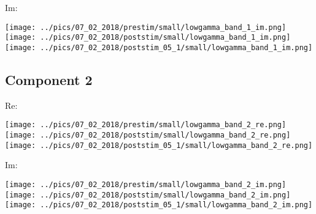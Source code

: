 \documentclass{article}
\begin{document}
Im:

\hspace{0.5cm}
\texttt{[image: ../pics/07\_02\_2018/prestim/small/lowgamma\_band\_1\_im.png]}
\hspace{0.5cm}
\texttt{[image: ../pics/07\_02\_2018/poststim/small/lowgamma\_band\_1\_im.png]}
\hspace{0.5cm}
\texttt{[image: ../pics/07\_02\_2018/poststim\_05\_1/small/lowgamma\_band\_1\_im.png]}

\subsection*{Component 2}
Re:

\hspace{0.5cm}
\texttt{[image: ../pics/07\_02\_2018/prestim/small/lowgamma\_band\_2\_re.png]}
\hspace{0.5cm}
\texttt{[image: ../pics/07\_02\_2018/poststim/small/lowgamma\_band\_2\_re.png]}
\hspace{0.5cm}
\texttt{[image: ../pics/07\_02\_2018/poststim\_05\_1/small/lowgamma\_band\_2\_re.png]}

Im:

\hspace{0.5cm}
\texttt{[image: ../pics/07\_02\_2018/prestim/small/lowgamma\_band\_2\_im.png]}
\hspace{0.5cm}
\texttt{[image: ../pics/07\_02\_2018/poststim/small/lowgamma\_band\_2\_im.png]}
\hspace{0.5cm}
\texttt{[image: ../pics/07\_02\_2018/poststim\_05\_1/small/lowgamma\_band\_2\_im.png]}

\end{document}
